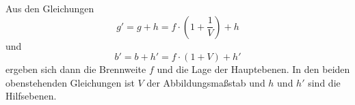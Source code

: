 Aus den Gleichungen
\begin{equation}
	g' = g + h = f \cdot \left(1 + \frac{1}{V} \right) + h
	\label{eqn:g'}
\end{equation}
und
\begin{equation}
	b' = b + h' = f \cdot \left(1 + V \right) + h'
	\label{eqn:b'}
\end{equation}
ergeben sich dann die Brennweite $f$ und die Lage der Hauptebenen. In den beiden obenstehenden Gleichungen ist $V$ der Abbildungsmaßstab und $h$ und $h'$ sind die Hilfsebenen.
